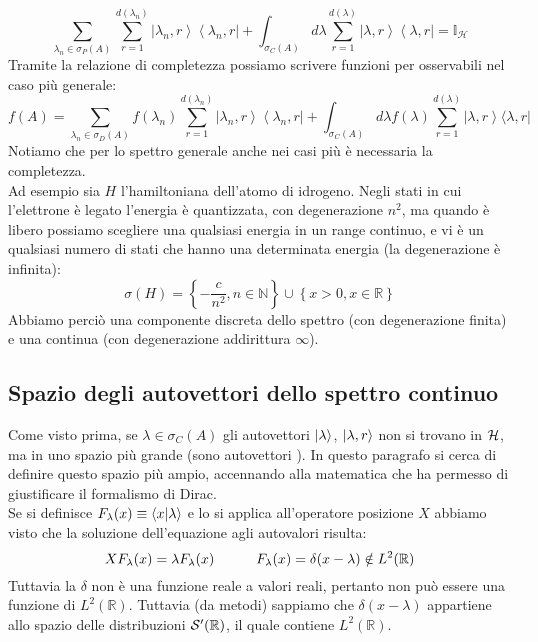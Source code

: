 \documentclass[../../FisicaTeorica.tex]{subfiles}
\begin{document}
\[
\sum_{\lambda_n\in\sigma_P\left(A\right)}\sum_{r=1}^{d\left(\lambda_n\right)}{\left|\lambda_n,r\right\rangle\left\langle\lambda_n,r\right|+\int_{\sigma_C\left(A\right)}d\lambda\sum_{r=1}^{d\left(\lambda\right)}\left|\lambda,r\right\rangle\left\langle\lambda,r\right|=\mathbb{I}_\mathcal{H}}
\]
Tramite la relazione di completezza possiamo scrivere funzioni per osservabili nel caso più generale:
\[
f\left(A\right)= \sum_{\lambda_n\in\sigma_D\left(A\right)} f\left(\lambda_n\right)\sum_{r=1}^{d\left(\lambda_n\right)}\left|\lambda_n,r\right\rangle\left\langle\lambda_n,r\right|+\int_{\sigma_C\left(A\right)}{d\lambda f\left(\lambda\right)}\sum_{r=1}^{d\left(\lambda\right)}{\left|\lambda,r\right\rangle\langle\lambda,r|}
\]
Notiamo che per lo spettro generale anche nei casi più  è necessaria la completezza.\\

Ad esempio sia $H$ l'hamiltoniana dell'atomo di idrogeno. Negli stati in cui l'elettrone è legato l'energia è quantizzata, con degenerazione $n^2$, ma quando è libero possiamo scegliere una qualsiasi energia in un range continuo, e vi è un qualsiasi numero di stati che hanno una determinata energia (la degenerazione è infinita):
\[
\sigma \left(H\right)=\left\{-\frac{c}{n^2},n\in\mathbb{N}\right\}\cup \left\{x>0,x\in\mathbb{R}\right\}
\]
Abbiamo perciò una componente discreta dello spettro (con degenerazione finita) e una continua (con degenerazione addirittura $\infty$).


\subsection{Spazio degli autovettori dello spettro continuo}
Come visto prima, se $\lambda \in \sigma_C(A)$ gli autovettori $\ket{\lambda}$, $\ket{\lambda,r}$ non si trovano in $\mathcal{H}$, ma in uno spazio più grande (sono autovettori ). In questo paragrafo si cerca di definire questo spazio più ampio, accennando alla matematica che ha permesso di giustificare il formalismo di Dirac.\\
Se si definisce  $F_\lambda(x) \equiv \braket{x|\lambda}$ e lo si applica all'operatore posizione $X$ abbiamo visto che la soluzione dell'equazione agli autovalori risulta:
\[
XF_\lambda(x) = \lambda F_\lambda(x) \qquad \quad F_\lambda(x) = \delta(x-\lambda) \notin L^2(\mathbb{R})
\]
Tuttavia la $\delta$ non è una funzione reale a valori reali, pertanto non può essere una funzione di $L^2(\mathbb R)$. Tuttavia (da metodi) sappiamo che  $\delta(x-\lambda)$ appartiene allo spazio delle distribuzioni $\mathcal{S}'(\mathbb{R})$, il quale contiene $L^2(\mathbb R)$.
\end{document}
